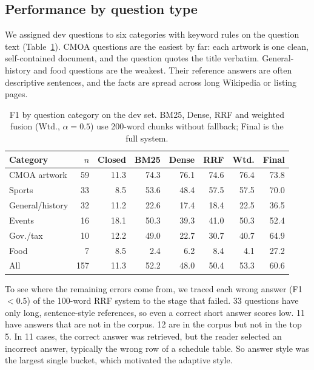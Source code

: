 \documentclass[11pt]{article}
\begin{document}
\subsection{Performance by question type}

We assigned dev questions to six categories with keyword rules on the question text (Table~\ref{tab:category}). CMOA questions are the easiest by far: each artwork is one clean, self-contained document, and the question quotes the title verbatim. General-history and food questions are the weakest. Their reference answers are often descriptive sentences, and the facts are spread across long Wikipedia or listing pages.

\begin{table}[t]
  \centering
  \footnotesize
  \setlength{\tabcolsep}{2.5pt}
  \begin{tabular}{lrrrrrrr}
    \toprule
    Category & $n$ & Closed & BM25 & Dense & RRF & Wtd. & Final \\
    \midrule
    CMOA artwork & 59 & 11.3 & 74.3 & 76.1 & 74.6 & 76.4 & 73.8 \\
    Sports & 33 & 8.5 & 53.6 & 48.4 & 57.5 & 57.5 & 70.0 \\
    General/history & 32 & 11.2 & 22.6 & 17.4 & 18.4 & 22.5 & 36.5 \\
    Events & 16 & 18.1 & 50.3 & 39.3 & 41.0 & 50.3 & 52.4 \\
    Gov./tax & 10 & 12.2 & 49.0 & 22.7 & 30.7 & 40.7 & 64.9 \\
    Food & 7 & 8.5 & 2.4 & 6.2 & 8.4 & 4.1 & 27.2 \\
    \midrule
    All & 157 & 11.3 & 52.2 & 48.0 & 50.4 & 53.3 & 60.6 \\
    \bottomrule
  \end{tabular}
  \caption{F1 by question category on the dev set. BM25, Dense, RRF and weighted fusion (Wtd., $\alpha{=}0.5$) use 200-word chunks without fallback; Final is the full system.}
  \label{tab:category}
\end{table}

To see where the remaining errors come from, we traced each wrong answer (F1 $<0.5$) of the 100-word RRF system to the stage that failed. 33 questions have only long, sentence-style references, so even a correct short answer scores low. 11 have answers that are not in the corpus. 12 are in the corpus but not in the top 5. In 11 cases, the correct answer was retrieved, but the reader selected an incorrect answer, typically the wrong row of a schedule table. So answer style was the largest single bucket, which motivated the adaptive style.
\end{document}
